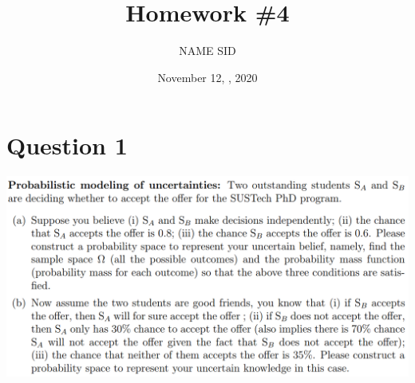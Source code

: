 \documentclass[
	12pt, %
]{fphw}
\title{Homework \#4} %
\author{NAME SID} %
\date{November 12, , 2020} %
\institute{SOUTHERN UNIVERSITY\\OF SCIENCE AND TECHNOLOGY} %
\begin{document}
\maketitle %


\section*{Question 1}
\begin{problem}
	\includegraphics[width=440pt]{img/q1.png}
\end{problem}

\end{document}
